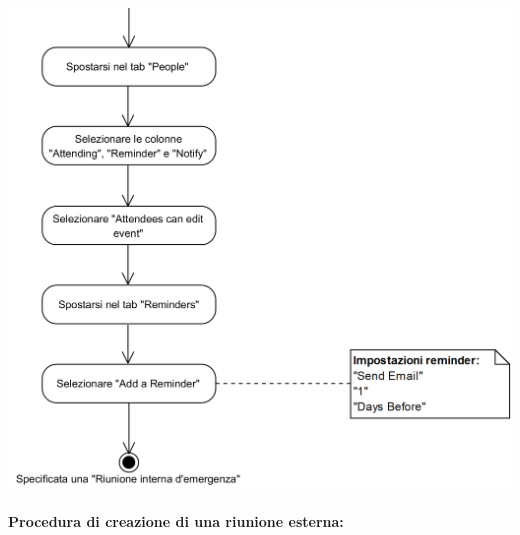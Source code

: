 \begin{center}
	\includegraphics[width=15cm]{./DiagrammiProcedure/RiunioneInternaDiEmergenza2.png}
\end{center}

\paragraph{Procedura di creazione di una riunione esterna:}

